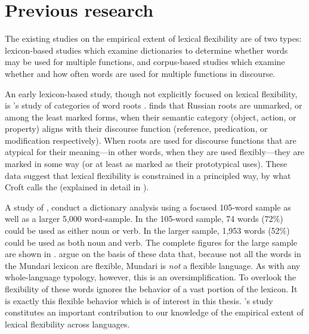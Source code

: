 \section{Previous research}
\label{sec:1.2}

The existing studies on the empirical extent of lexical flexibility are of two types: lexicon-based studies which examine dictionaries to determine whether words may be used for multiple functions, and corpus-based studies which examine whether and how often words are used for multiple functions in discourse.

An early lexicon-based study, though not explicitly focused on lexical flexibility, is \citeauthor{Croft1984}'s \parencite*{Croft1984} study of categories of  word roots . \citeauthor{Croft1991} finds that Russian roots are unmarked, or among the least marked forms, when their semantic category (object, action, or property) aligns with their discourse function (reference, predication, or modification respectively). When roots are used for discourse functions that are atypical for their meaning—in other words, when they are used flexibly—they are marked in some way (or at least as marked as their prototypical uses). These data suggest that lexical flexibility is constrained in a principled way, by what Croft calls the  (explained in detail in ).

A study of , \textcite{EvansOsada2005} conduct a dictionary analysis using a focused 105-word sample as well as a larger 5,000 word-sample. In the 105-word sample, 74 words (72\%) could be used as either noun or verb. In the larger sample, 1,953 words (52\%) could be used as both noun and verb. The complete figures for the large sample are shown in . \citeauthor{EvansOsada2005} argue on the basis of these data that, because not all the words in the Mundari lexicon are flexible, Mundari is \emph{not} a flexible language. As with any whole-language typology, however, this is an oversimplification. To overlook the flexibility of these words ignores the behavior of a vast portion of the lexicon. It is exactly this flexible behavior which is of interest in this thesis. \citeauthor{EvansOsada2005}'s study constitutes an important contribution to our knowledge of the empirical extent of lexical flexibility across languages.

